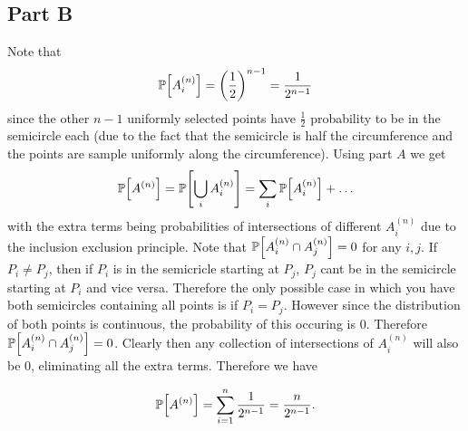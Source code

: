 \documentclass{eeleyes}
\begin{document}
\subsection*{Part B}
Note that
\[
    \mathbb{P}\qty[A_i^{(n)}] = \qty(\frac{1}{2})^{n-1} = \frac{1}{2^{n-1}}
\]
since the other $n-1$ uniformly selected points have $\frac{1}{2}$ probability to be in the semicircle each (due to the fact that the semicircle is half the circumference and the points are sample uniformly along the circumference). Using part $A$ we get
\[
    \mathbb{P}\qty[A^{(n)}] = \mathbb{P}\qty[\bigcup_{i} A_{i}^{(n)}] = \sum_{i} \mathbb{P}\qty[A_i^{(n)}] + \ldots
\]
with the extra terms being probabilities of intersections of different $A_i^{(n)}$ due to the inclusion exclusion principle. Note that $\mathbb{P}\qty[A_i^{(n)} \cap A_j^{(n)}] = 0$ for any $i,j$. If $P_i \neq P_j$, then if $P_i$ is in the semicricle starting at $P_j$, $P_j$ cant be in the semicircle starting at $P_i$ and vice versa. Therefore the only possible case in which you have both semicircles containing all points is if $P_i = P_j$. However since the distribution of both points is continuous, the probability of this occuring is $0$. Therefore $\mathbb{P}\qty[A_i^{(n)} \cap A_j^{(n)}] = 0$. Clearly then any collection of intersections of $A_i^{(n)}$ will also be $0$, eliminating all the extra terms. Therefore we have

\[
    \mathbb{P}\qty[A^{(n)}] = \sum_{i=1}^n \frac{1}{2^{n-1}} = \frac{n}{2^{n-1}}
.\]
\end{document}
